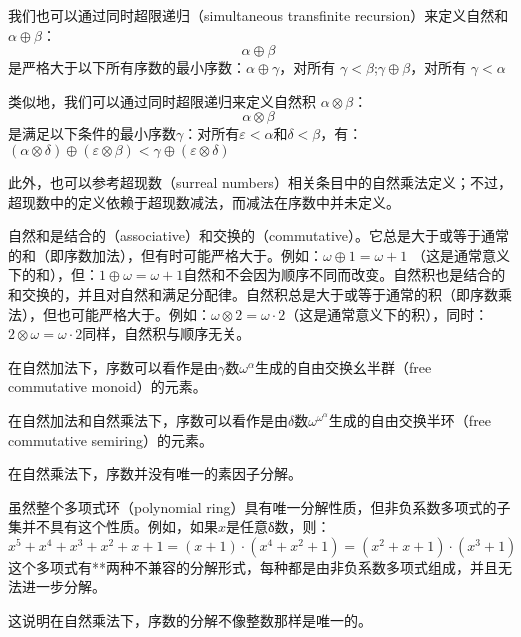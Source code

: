 我们也可以通过同时超限递归（simultaneous transfinite recursion）来定义自然和 \(\alpha \oplus \beta\)：  
\[
\alpha \oplus \beta~
\]
是严格大于以下所有序数的最小序数：\(\alpha \oplus \gamma\)，对所有 \(\gamma < \beta\);\(\gamma \oplus \beta\)，对所有 \(\gamma < \alpha\)

类似地，我们可以通过同时超限递归来定义自然积 \(\alpha \otimes \beta\)：  
\[
\alpha \otimes \beta~
\]
是满足以下条件的最小序数\(\gamma\)：对所有\(\varepsilon < \alpha\)和\(\delta < \beta\)，有：\((\alpha \otimes \delta) \oplus (\varepsilon \otimes \beta) < \gamma \oplus (\varepsilon \otimes \delta)\)

此外，也可以参考超现数（surreal numbers）相关条目中的自然乘法定义；不过，超现数中的定义依赖于超现数减法，而减法在序数中并未定义。

自然和是结合的（associative）和交换的（commutative）。它总是大于或等于通常的和（即序数加法），但有时可能严格大于。例如：\(\omega\oplus1=\omega+1\)
（这是通常意义下的和），但：\(1 \oplus \omega = \omega + 1\)自然和不会因为顺序不同而改变。自然积也是结合的和交换的，并且对自然和满足分配律。自然积总是大于或等于通常的积（即序数乘法），但也可能严格大于。例如：\(\omega \otimes 2 = \omega \cdot 2\)（这是通常意义下的积），同时：\(2 \otimes \omega =\omega \cdot 2\)同样，自然积与顺序无关。

在自然加法下，序数可以看作是由\(\gamma\)数\(\omega^\alpha\)生成的自由交换幺半群（free commutative monoid）的元素。  

在自然加法和自然乘法下，序数可以看作是由\(\delta\)数\(\omega^{\omega^\alpha}\)生成的自由交换半环（free commutative semiring）的元素。  

在自然乘法下，序数并没有唯一的素因子分解。  

虽然整个多项式环（polynomial ring）具有唯一分解性质，但非负系数多项式的子集并不具有这个性质。例如，如果\(x\)是任意δ数，则：
\[
x^5 + x^4 + x^3 + x^2 + x + 1 = (x+1)\cdot (x^4 + x^2 + 1) = (x^2 + x + 1)\cdot (x^3 + 1)~
\]
这个多项式有**两种不兼容的分解形式，每种都是由非负系数多项式组成，并且无法进一步分解。  

这说明在自然乘法下，序数的分解不像整数那样是唯一的。